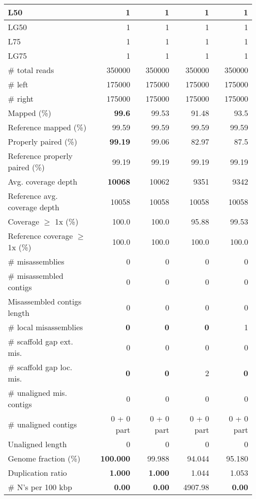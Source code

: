 \documentclass[12pt,a4paper]{article}
\begin{document}
\begin{table}[ht]
\begin{center}
\begin{tabular}{|l*{4}{|r}|}
L50 & 1 & 1 & 1 & 1 \\ \hline
LG50 & 1 & 1 & 1 & 1 \\ \hline
L75 & 1 & 1 & 1 & 1 \\ \hline
LG75 & 1 & 1 & 1 & 1 \\ \hline
\# total reads & 350000 & 350000 & 350000 & 350000 \\ \hline
\# left & 175000 & 175000 & 175000 & 175000 \\ \hline
\# right & 175000 & 175000 & 175000 & 175000 \\ \hline
Mapped (\%) & {\bf 99.6} & 99.53 & 91.48 & 93.5 \\ \hline
Reference mapped (\%) & 99.59 & 99.59 & 99.59 & 99.59 \\ \hline
Properly paired (\%) & {\bf 99.19} & 99.06 & 82.97 & 87.5 \\ \hline
Reference properly paired (\%) & 99.19 & 99.19 & 99.19 & 99.19 \\ \hline
Avg. coverage depth & {\bf 10068} & 10062 & 9351 & 9342 \\ \hline
Reference avg. coverage depth & 10058 & 10058 & 10058 & 10058 \\ \hline
Coverage $\geq$ 1x (\%) & 100.0 & 100.0 & 95.88 & 99.53 \\ \hline
Reference coverage $\geq$ 1x (\%) & 100.0 & 100.0 & 100.0 & 100.0 \\ \hline
\# misassemblies & 0 & 0 & 0 & 0 \\ \hline
\# misassembled contigs & 0 & 0 & 0 & 0 \\ \hline
Misassembled contigs length & 0 & 0 & 0 & 0 \\ \hline
\# local misassemblies & {\bf 0} & {\bf 0} & {\bf 0} & 1 \\ \hline
\# scaffold gap ext. mis. & 0 & 0 & 0 & 0 \\ \hline
\# scaffold gap loc. mis. & {\bf 0} & {\bf 0} & 2 & {\bf 0} \\ \hline
\# unaligned mis. contigs & 0 & 0 & 0 & 0 \\ \hline
\# unaligned contigs & 0 + 0 part & 0 + 0 part & 0 + 0 part & 0 + 0 part \\ \hline
Unaligned length & 0 & 0 & 0 & 0 \\ \hline
Genome fraction (\%) & {\bf 100.000} & 99.988 & 94.044 & 95.180 \\ \hline
Duplication ratio & {\bf 1.000} & {\bf 1.000} & 1.044 & 1.053 \\ \hline
\# N's per 100 kbp & {\bf 0.00} & {\bf 0.00} & 4907.98 & {\bf 0.00} \\ \hline

\end{tabular}
\end{center}
\end{table}
\end{document}
